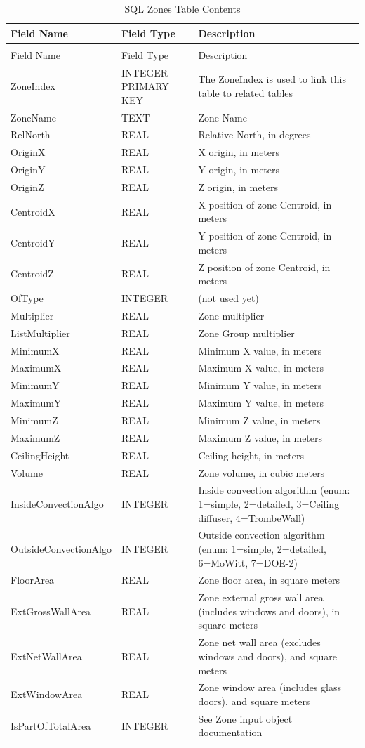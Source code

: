 \begin{longtable}[c]{>{\raggedright}p{1.5in}>{\raggedright}p{1.5in}>{\raggedright}p{3.0in}}
\caption{SQL Zones Table Contents \label{table:table-14.-sql-zones-table-contents}} \tabularnewline
\toprule
Field Name & Field Type & Description \tabularnewline
\midrule
\endfirsthead

\caption[]{SQL Zones Table Contents} \tabularnewline
\toprule
Field Name & Field Type & Description \tabularnewline
\midrule
\endhead

ZoneIndex & INTEGER PRIMARY KEY & The ZoneIndex is used to link this table to related tables \tabularnewline
ZoneName & TEXT & Zone Name \tabularnewline
RelNorth & REAL & Relative North, in degrees \tabularnewline
OriginX & REAL & X origin, in meters \tabularnewline
OriginY & REAL & Y origin, in meters \tabularnewline
OriginZ & REAL & Z origin, in meters \tabularnewline
CentroidX & REAL & X position of zone Centroid, in meters \tabularnewline
CentroidY & REAL & Y position of zone Centroid, in meters \tabularnewline
CentroidZ & REAL & Z position of zone Centroid, in meters \tabularnewline
OfType & INTEGER & (not used yet) \tabularnewline
Multiplier & REAL & Zone multiplier \tabularnewline
ListMultiplier & REAL & Zone Group multiplier \tabularnewline
MinimumX & REAL & Minimum X value, in meters \tabularnewline
MaximumX & REAL & Maximum X value, in meters \tabularnewline
MinimumY & REAL & Minimum Y value, in meters \tabularnewline
MaximumY & REAL & Maximum Y value, in meters \tabularnewline
MinimumZ & REAL & Minimum Z value, in meters \tabularnewline
MaximumZ & REAL & Maximum Z value, in meters \tabularnewline
CeilingHeight & REAL & Ceiling height, in meters \tabularnewline
Volume & REAL & Zone volume, in cubic meters \tabularnewline
Inside\-Convection\-Algo & INTEGER & Inside convection algorithm (enum: 1=simple, 2=detailed, 3=Ceiling diffuser, 4=TrombeWall) \tabularnewline
Outside\-Convection\-Algo & INTEGER & Outside convection algorithm (enum: 1=simple, 2=detailed, 6=MoWitt, 7=DOE-2) \tabularnewline
FloorArea & REAL & Zone floor area, in square meters \tabularnewline
ExtGrossWall\-Area & REAL & Zone external gross wall area (includes windows and doors), in square meters \tabularnewline
ExtNetWallArea & REAL & Zone net wall area (excludes windows and doors), and square meters \tabularnewline
ExtWindowArea & REAL & Zone window area (includes glass doors), and square meters \tabularnewline
IsPartOfTotalArea & INTEGER & See Zone input object documentation \tabularnewline
\bottomrule
\end{longtable}

